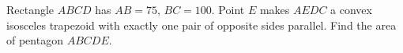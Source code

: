 Rectangle $ABCD$ has $AB=75$, $BC=100$. Point $E$ makes $AEDC$ a convex isosceles trapezoid with exactly one pair of opposite sides parallel. Find the area of pentagon $ABCDE$.
